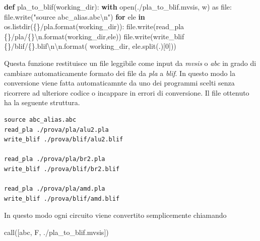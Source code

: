 \documentclass[
]{book}
\newenvironment{Shaded}{\begin{snugshade}}{\end{snugshade}}
\newcommand{\BuiltInTok}[1]{#1}
\newcommand{\CharTok}[1]{\textcolor[rgb]{0.31,0.60,0.02}{#1}}
\newcommand{\ControlFlowTok}[1]{\textcolor[rgb]{0.13,0.29,0.53}{\textbf{#1}}}
\newcommand{\DecValTok}[1]{\textcolor[rgb]{0.00,0.00,0.81}{#1}}
\newcommand{\ImportTok}[1]{#1}
\newcommand{\KeywordTok}[1]{\textcolor[rgb]{0.13,0.29,0.53}{\textbf{#1}}}
\newcommand{\NormalTok}[1]{#1}
\newcommand{\SpecialCharTok}[1]{\textcolor[rgb]{0.00,0.00,0.00}{#1}}
\newcommand{\StringTok}[1]{\textcolor[rgb]{0.31,0.60,0.02}{#1}}
\begin{document}
\begin{Shaded}
\begin{Highlighting}[]
\KeywordTok{def}\NormalTok{ pla\_to\_blif(working\_dir):}
  \ControlFlowTok{with} \BuiltInTok{open}\NormalTok{(}\StringTok{\textquotesingle{}./pla\_to\_blif.mvsis\textquotesingle{}}\NormalTok{, }\StringTok{\textquotesingle{}w\textquotesingle{}}\NormalTok{) }\ImportTok{as} \BuiltInTok{file}\NormalTok{:}
    \BuiltInTok{file}\NormalTok{.write(}\StringTok{"source abc\_alias.abc}\CharTok{\textbackslash{}n}\StringTok{"}\NormalTok{)}
    \ControlFlowTok{for}\NormalTok{ ele }\KeywordTok{in}\NormalTok{ os.listdir(}\StringTok{\textquotesingle{}}\SpecialCharTok{\{\}}\StringTok{/pla\textquotesingle{}}\NormalTok{.}\BuiltInTok{format}\NormalTok{(working\_dir)):}
      \BuiltInTok{file}\NormalTok{.write(}\StringTok{\textquotesingle{}read\_pla }\SpecialCharTok{\{\}}\StringTok{/pla/}\SpecialCharTok{\{\}}\CharTok{\textbackslash{}n}\StringTok{\textquotesingle{}}\NormalTok{.}\BuiltInTok{format}\NormalTok{(working\_dir,ele))}
      \BuiltInTok{file}\NormalTok{.write(}\StringTok{\textquotesingle{}write\_blif }\SpecialCharTok{\{\}}\StringTok{/blif/}\SpecialCharTok{\{\}}\StringTok{.blif}\CharTok{\textbackslash{}n\textbackslash{}n}\StringTok{\textquotesingle{}}\NormalTok{.}\BuiltInTok{format}\NormalTok{(}
\NormalTok{        working\_dir, ele.split(}\StringTok{\textquotesingle{}.\textquotesingle{}}\NormalTok{)[}\DecValTok{0}\NormalTok{]))}
\end{Highlighting}
\end{Shaded}

Questa funzione restituisce un file leggibile come input da \emph{mvsis} o \emph{abc} in grado di cambiare automaticamente formato dei file da \emph{pla} a \emph{blif}. In questo modo la conversione viene fatta automaticamnte da uno dei programmi scelti senza ricorrere ad ulteriore codice o incappare in errori di conversione. Il file ottenuto ha la seguente struttura.

\begin{verbatim}
source abc_alias.abc
read_pla ./prova/pla/alu2.pla
write_blif ./prova/blif/alu2.blif

read_pla ./prova/pla/br2.pla
write_blif ./prova/blif/br2.blif

read_pla ./prova/pla/amd.pla
write_blif ./prova/blif/amd.blif
\end{verbatim}

In questo modo ogni circuito viene convertito semplicemente chiamando

\begin{Shaded}
\begin{Highlighting}[]
\NormalTok{call([}\StringTok{\textquotesingle{}abc\textquotesingle{}}\NormalTok{, }\StringTok{\textquotesingle{}{-}F\textquotesingle{}}\NormalTok{, }\StringTok{\textquotesingle{}./pla\_to\_blif.mvsis\textquotesingle{}}\NormalTok{])}
\end{Highlighting}
\end{Shaded}
\end{document}

